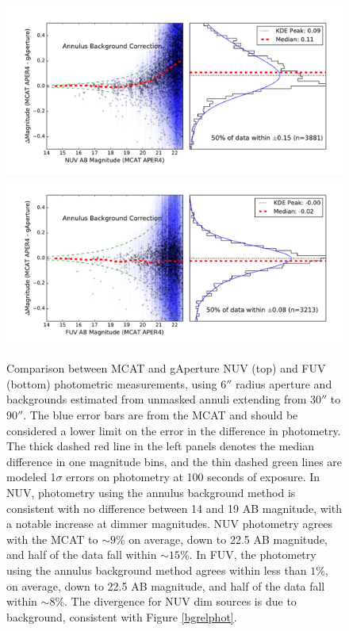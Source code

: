 \documentclass[preprint]{aastex}
\begin{document}
\begin{figure}[t!]
\includegraphics[scale=0.6]{Fig04a.pdf}\\
\includegraphics[scale=0.6]{Fig04b.pdf}
\caption{Comparison between MCAT and gAperture NUV (top) and FUV (bottom) photometric measurements, using $6''$ radius aperture and backgrounds estimated from unmasked annuli extending from $30''$ to $90''$. The blue error bars are from the MCAT and should be considered a lower limit on the error in the difference in photometry. The thick dashed red line in the left panels denotes the median difference in one magnitude bins, and the thin dashed green lines are modeled 1$\sigma$ errors on photometry at 100 seconds of exposure. In NUV, photometry using the annulus background method is consistent with no difference between 14 and 19 AB magnitude, with a notable increase at dimmer magnitudes. NUV photometry agrees with the MCAT to $\sim 9$\% on average, down to 22.5 AB magnitude, and half of the data fall within $\sim 15$\%. In FUV, the photometry using the annulus background method agrees within less than $1$\%, on average, down to 22.5 AB magnitude, and half of the data fall within $\sim 8$\%. The divergence for NUV dim sources is due to background, consistent with Figure \ref{bgrelphot}.
\label{annulusrelphot}}
\end{figure}
\clearpage
\end{document}
